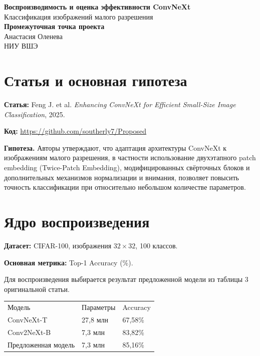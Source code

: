 \documentclass[11pt,a4paper]{article}
\begin{document}
\begin{center}
    {\Large\bfseries Воспроизводимость и оценка
    эффективности ConvNeXt}\\[4pt]
    {\normalsize Классификация изображений малого разрешения}\\[6pt]
    \textbf{Промежуточная точка проекта}\\[4pt]
    Анастасия Оленева\\
    НИУ ВШЭ
\end{center}

\vspace{-0.5em}

\section{Статья и основная гипотеза}

\textbf{Статья:}
Feng J. et al.
\textit{Enhancing ConvNeXt for Efficient Small-Size
Image Classification}, 2025.

\textbf{Код:}
\url{https://github.com/southerly7/Proposed}

\textbf{Гипотеза.}
Авторы утверждают, что адаптация архитектуры ConvNeXt к изображениям малого разрешения, в частности использование двухэтапного patch embedding (Twice-Patch Embedding), модифицированных свёрточных блоков и дополнительных механизмов нормализации и внимания, позволяет повысить точность классификации при относительно небольшом количестве параметров. 


\section{Ядро воспроизведения}

\textbf{Датасет:} CIFAR-100, изображения $32\times32$,
100 классов.

\textbf{Основная метрика:} Top-1 Accuracy (\%).

Для воспроизведения выбирается результат предложенной модели из таблицы 3 оригинальной статьи.

\begin{table}[H]
\centering

\begin{tabular}{l l l}
Модель & Параметры & Accuracy \\
ConvNeXt-T & 27,8 млн & 67,58\% \\
Conv2NeXt-B & 7,3 млн & 83,82\% \\
Предложенная модель & 7,3 млн & 85,16\% \\

\end{tabular}

\end{table}
\end{document}
